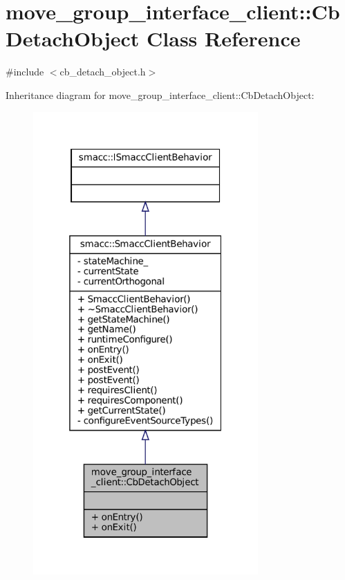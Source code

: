\hypertarget{classmove__group__interface__client_1_1CbDetachObject}{}\section{move\+\_\+group\+\_\+interface\+\_\+client\+:\+:Cb\+Detach\+Object Class Reference}
\label{classmove__group__interface__client_1_1CbDetachObject}


{\ttfamily \#include $<$cb\+\_\+detach\+\_\+object.\+h$>$}



Inheritance diagram for move\+\_\+group\+\_\+interface\+\_\+client\+:\+:Cb\+Detach\+Object\+:
\nopagebreak
\begin{figure}[H]
\begin{center}
\leavevmode
\includegraphics[width=244pt]{classmove__group__interface__client_1_1CbDetachObject__inherit__graph}
\end{center}
\end{figure}


